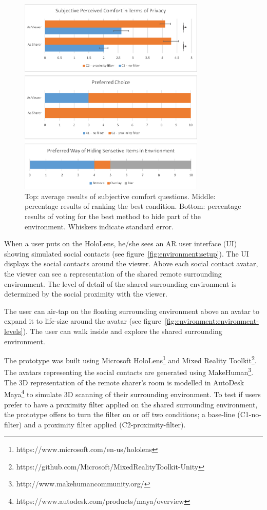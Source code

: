 \begin{figure}[t]
  \centering
  \includegraphics[width=3.5in]{images/ismar18/images-04.eps}
  \caption{Top: average results of subjective comfort questions. Middle: percentage results of ranking the best condition. Bottom: percentage results of voting for the best method to hide part of the environment. Whiskers indicate standard error.}
  \label{fig:environment:results}
\end{figure}

When a user puts on the HoloLens, he/she sees an AR user interface (UI) showing simulated social contacts (see figure~\ref{fig:environment:setup}). The UI displays the social contacts around the viewer. Above each social contact avatar, the viewer can see a representation of the shared remote surrounding environment. The level of detail of the shared surrounding environment is determined by the social proximity with the viewer.

The user can air-tap on the floating surrounding environment above an avatar to expand it to life-size around the avatar (see figure~\ref{fig:environment:environment-levels}). The user can walk inside and explore the shared surrounding environment.

The prototype was built using Microsoft HoloLens\footnote{https://www.microsoft.com/en-us/hololens} and Mixed Reality Toolkit\footnote{https://github.com/Microsoft/MixedRealityToolkit-Unity}. The avatars representing the social contacts are generated using MakeHuman\footnote{http://www.makehumancommunity.org/}. The 3D representation of the remote sharer's room is modelled in AutoDesk Maya\footnote{https://www.autodesk.com/products/maya/overview} to simulate 3D scanning of their surrounding environment. To test if users prefer to have a proximity filter applied on the shared surrounding environment, the prototype offers to turn the filter on or off two conditions; a base-line (C1-no-filter) and a proximity filter applied (C2-proximity-filter).


